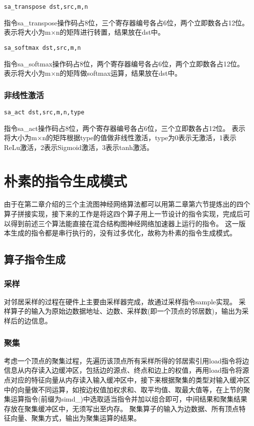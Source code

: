 \begin{lstlisting}[language={[x86masm]Assembler}] 
    sa_transpose dst,src,m,n
\end{lstlisting}
指令sa\_transpose操作码占8位，三个寄存器编号各占6位，两个立即数各占12位。
表示将大小为m$\times$n的矩阵进行转置，结果放在dst中。

\begin{lstlisting}[language={[x86masm]Assembler}] 
    sa_softmax dst,src,m,n
\end{lstlisting}
指令sa\_softmax操作码占8位，两个寄存器编号各占6位，两个立即数各占12位。
表示将大小为m$\times$n的矩阵做softmax运算，结果放在dst中。

\subsubsection{非线性激活}
\begin{lstlisting}[language={[x86masm]Assembler}] 
    sa_act dst,src,m,n,type
\end{lstlisting}
指令sa\_act操作码占8位，两个寄存器编号各占6位，三个立即数各占12位。
表示将大小为m$\times$n的矩阵根据type的值做非线性激活，type为0表示无激活，1表示ReLu激活，2表示Sigmoid激活，3表示tanh激活。

\section{朴素的指令生成模式}
由于在第二章介绍的三个主流图神经网络算法都可以用第二章第六节提炼出的四个算子拼接实现，接下来的工作是将这四个算子用上一节设计的指令实现，完成后可以得到前述三个算法能直接在混合结构图神经网络加速器上运行的指令。
这一版本生成的指令都是串行执行的，没有过多优化，故称为朴素的指令生成模式。

\subsection{算子指令生成}

\subsubsection{采样}
对邻居采样的过程在硬件上主要由采样器完成，故通过采样指令sample实现。
采样算子的输入为原始边数据地址、边数、采样数(即一个顶点的邻居数)，输出为采样后的边信息。

\subsubsection{聚集}
考虑一个顶点的聚集过程，先遍历该顶点所有采样所得的邻居索引用load指令将边信息从内存读入边缓冲区，包括边的源点、终点和边上的权值，再用load指令将源点对应的特征向量从内存读入输入缓冲区中，接下来根据聚集的类型对输入缓冲区中的向量做不同运算，如按边权值加权求和、取平均值、取最大值等，在上节的聚集运算指令(前缀为simd\_)中选取适当指令并加以组合即可，中间结果和聚集结果存放在聚集缓冲区中，无须写出至内存。
聚集算子的输入为边数据、所有顶点特征向量、聚集方式，输出为聚集运算的结果。

